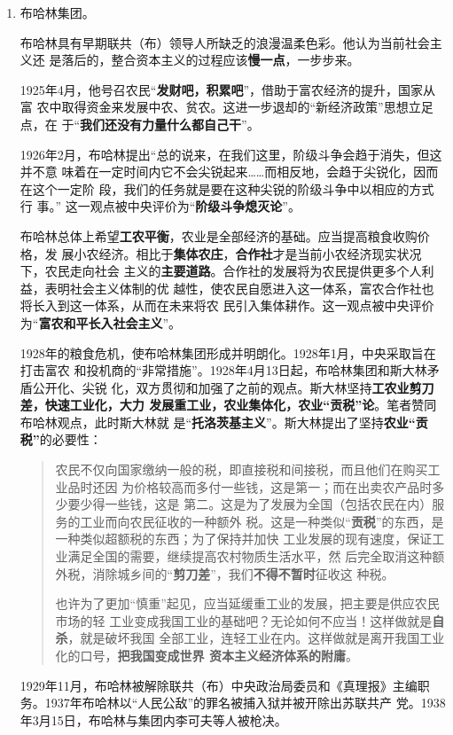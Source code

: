 \begin{enumerate}
\item 布哈林集团。

  布哈林具有早期联共（布）领导人所缺乏的浪漫温柔色彩。他认为当前社会主义还
  是落后的，整合资本主义的过程应该\textbf{慢一点}，一步步来。

  1925年4月，他号召农民“\textbf{发财吧，积累吧}”，借助于富农经济的提升，国家从富
  农中取得资金来发展中农、贫农。这进一步退却的“新经济政策”思想立足点，在
  于“\textbf{我们还没有力量什么都自己干}”。\cite[368-371]{buhalinwen1}

  1926年2月，布哈林提出“总的说来，在我们这里，阶级斗争会趋于消失，但这并不意
  味着在一定时间内它不会尖锐起来……而相反地，会趋于尖锐化，因而在这个一定阶
  段，我们的任务就是要在这种尖锐的阶级斗争中以相应的方式行
  事。”\cite[18-19]{buhalinwen2} 这一观点被中央评价为“\textbf{阶级斗争熄灭论}”。

  布哈林总体上希望\textbf{工农平衡}，农业是全部经济的基础。应当提高粮食收购价格，发
  展小农经济。相比于\textbf{集体农庄}，\textbf{合作社}才是当前小农经济现实状况下，农民走向社会
  主义的\textbf{主要道路}。合作社的发展将为农民提供更多个人利益，表明社会主义体制的优
  越性，使农民自愿进入这一体系，富农合作社也将长入到这一体系，从而在未来将农
  民引入集体耕作。这一观点被中央评价为“\textbf{富农和平长入社会主义}”。

  1928年的粮食危机，使布哈林集团形成并明朗化。1928年1月，中央采取旨在打击富农
  和投机商的“非常措施”。1928年4月13日起，布哈林集团和斯大林矛盾公开化、尖锐
  化，双方贯彻和加强了之前的观点。斯大林坚持\textbf{工农业剪刀差，快速工业化，大力
    发展重工业，农业集体化，农业“贡税”论}。笔者赞同布哈林观点，此时斯大林就
  是“\textbf{托洛茨基主义}”。斯大林提出了坚持\textbf{农业“贡税”}的必要性：
  \begin{quotation}
    农民不仅向国家缴纳一般的税，即直接税和间接税，而且他们在购买工业品时还因
    为价格较高而多付一些钱，这是第一；而在出卖农产品时多少要少得一些钱，这是
    第二。这是为了发展为全国（包括农民在内）服务的工业而向农民征收的一种额外
    税。这是一种类似“\textbf{贡税}”的东西，是一种类似超额税的东西；为了保持并加快
    工业发展的现有速度，保证工业满足全国的需要，继续提高农村物质生活水平，然
    后完全取消这种额外税，消除城乡间的“\textbf{剪刀差}”，我们\textbf{不得不暂时}征收这
    种税。\cite[139-140]{stalin11}

    也许为了更加“慎重”起见，应当延缓重工业的发展，把主要是供应农民市场的轻
    工业变成我国工业的基础吧？无论如何不应当！这样做就是\textbf{自杀}，就是破坏我国
    全部工业，连轻工业在内。这样做就是离开我国工业化的口号，\textbf{把我国变成世界
      资本主义经济体系的附庸}。
  \end{quotation}

  1929年11月，布哈林被解除联共（布）中央政治局委员和《真理报》主编职
  务。1937年布哈林以“人民公敌”的罪名被捕入狱并被开除出苏联共产
  党。1938年3月15日，布哈林与集团内李可夫等人被枪决。
\end{enumerate}


